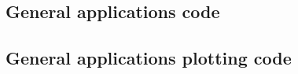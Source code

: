 \documentclass[twocolumn]{myarticle}
\begin{document}
\subsection{General applications code}
\label{subsec:general_applications_code}


\vspace{10pt}

\subsection{General applications plotting code}
\label{subsec:general_applications_plotting_code}


\vspace{10pt}
\end{document}
